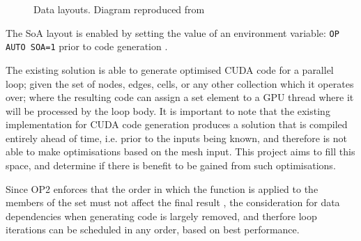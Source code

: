 \begin{figure}[h]
  \centering

  \quad

  \caption{\label{fig:soa_v_aos} Data layouts. Diagram reproduced from \cite{gpudesign}}
\end{figure}

\noindent The SoA layout is enabled by setting the value of an environment variable: \verb|OP AUTO SOA=1| prior to code generation \cite[p13]{manual}.
\par
The existing solution is able to generate optimised CUDA code for a parallel loop; given the set of nodes, edges, cells, or any other collection which it operates over; where the resulting code can assign a set element to a GPU thread where it will be processed by the loop body. It is important to note that the existing implementation for CUDA code generation produces a solution that is compiled entirely ahead of time, i.e. prior to the inputs being known, and therefore is not able to make optimisations based on the mesh input. This project aims to fill this space, and determine if there is benefit to be gained from such optimisations.
\par
Since OP2 enforces that the order in which the function is applied to the members of the set must not affect the final result \cite[p4]{manual}, the consideration for data dependencies when generating code is largely removed, and therfore loop iterations can be scheduled in any order, based on best performance.

